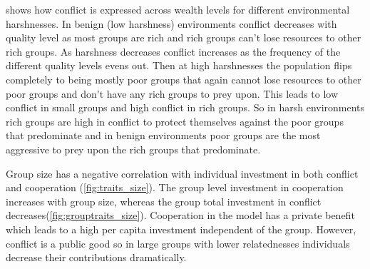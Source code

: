 
 shows how conflict is expressed across wealth levels for different environmental harshnesses. In benign (low harshness) environments conflict decreases with quality level as most groups are rich and rich groups can't lose resources to other rich groups. As harshness decreases conflict increases as the frequency of the different quality levels evens out. Then at high harshnesses the population flips completely to being mostly poor groups that again cannot lose resources to other poor groups and don't have any rich groups to prey upon. This leads to low conflict in small groups and high conflict in rich groups. So in harsh environments rich groups are high in conflict to protect themselves against the poor groups that predominate and in benign environments poor groups are the most aggressive to prey upon the rich groups that predominate. 



Group size has a negative correlation with individual investment in both conflict and cooperation (\cref{fig:traits_size}). The group level investment in cooperation increases with group size, whereas the group total investment in conflict decreases(\cref{fig:grouptraits_size}). Cooperation in the model has a private benefit which leads to a high per capita investment independent of the group. However, conflict is a public good so in large groups with lower relatednesses individuals decrease their contributions dramatically.



